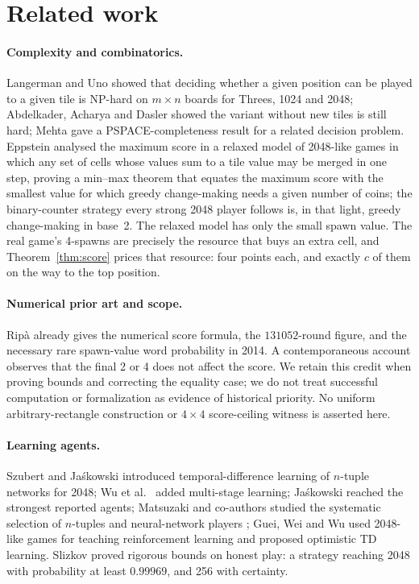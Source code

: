 \documentclass[11pt]{article}
\theoremstyle{definition}
\theoremstyle{remark}
\begin{document}
\section{Related work}

\paragraph{Complexity and combinatorics.} Langerman and Uno
\cite{langerman2016} showed that deciding whether a given position can be
played to a given tile is NP-hard on $m\times n$ boards for Threes, 1024
and 2048; Abdelkader, Acharya and Dasler \cite{abdelkader2016} showed the
variant without new tiles is still hard; Mehta \cite{mehta2014} gave a
PSPACE-completeness result for a related decision problem. Eppstein
\cite{eppstein2018} analysed the maximum score in a relaxed model of
2048-like games in which any set of cells whose values sum to a tile value
may be merged in one step, proving a min--max theorem that equates the
maximum score with the smallest value for which greedy change-making needs
a given number of coins; the binary-counter strategy every strong 2048
player follows is, in that light, greedy change-making in base~2. The
relaxed model has only the small spawn value. The real game's 4-spawns are
precisely the resource that buys an extra cell, and Theorem~\ref{thm:score}
prices that resource: four points each, and exactly $c$ of them on the way
to the top position.

\paragraph{Numerical prior art and scope.}
Rip\`a \cite{ripa2014,ripaoeis2014} already gives the numerical score
formula, the $131052$-round figure, and the necessary rare spawn-value
word probability in 2014. A contemporaneous account \cite{amo2014}
observes that the final 2 or 4 does not affect the score. We retain
this credit when proving bounds and correcting the equality case;
we do not treat successful computation or formalization as evidence of
historical priority. No uniform arbitrary-rectangle construction or
$4\times4$ score-ceiling witness is asserted here.

\paragraph{Learning agents.} Szubert and Ja\'skowski \cite{szubert2014}
introduced temporal-difference learning of $n$-tuple networks for 2048; Wu
et al.\ \cite{wu2014} added multi-stage learning; Ja\'skowski
\cite{jaskowski2018} reached the strongest reported agents; Matsuzaki and
co-authors studied the systematic selection of $n$-tuples and
neural-network players \cite{oka2016,matsuzaki2016,matsuzaki2017,matsuzaki2019};
Guei, Wei and Wu \cite{guei2020,guei2021} used 2048-like games for
teaching reinforcement learning and proposed optimistic TD learning.
Slizkov \cite{slizkov2023} proved rigorous bounds on honest play: a
strategy reaching 2048 with probability at least $0.99969$, and 256 with
certainty.
\end{document}
